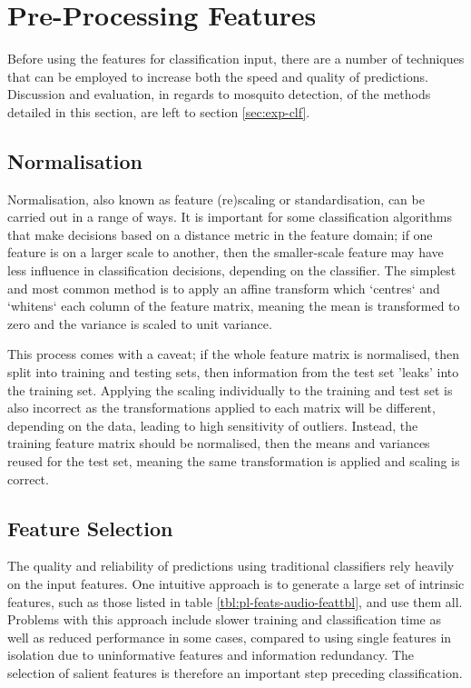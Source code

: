 \section{Pre-Processing Features}
\label{sec:pl-featpreproc}
    Before using the features for classification input, there are a number of techniques that can be employed to increase both the speed and quality of predictions. Discussion and evaluation, in regards to mosquito detection, of the methods detailed in this section, are left to section \ref{sec:exp-clf}.

    \subsection{Normalisation}
    \label{subsec:pl-featpreproc-norm}
        Normalisation, also known as feature (re)scaling or standardisation, can be carried out in a range of ways. It is important for some classification algorithms that make decisions based on a distance metric in the feature domain; if one feature is on a larger scale to another, then the smaller-scale feature may have less influence in classification decisions, depending on the classifier.     
        The simplest and most common method is to apply an affine transform which `centres` and `whitens` each column of the feature matrix, meaning the mean is transformed to zero and the variance is scaled to unit variance.
        
        This process comes with a caveat; if the whole feature matrix is normalised, then split into training and testing sets, then information from the test set 'leaks' into the training set. Applying the scaling individually to the training and test set is also incorrect as the transformations applied to each matrix will be different, depending on the data, leading to high sensitivity of outliers. Instead, the training feature matrix should be normalised, then the means and variances reused for the test set, meaning the same transformation is applied and scaling is correct.

    \subsection{Feature Selection}
    \label{subsec:pl-featpreproc-sel}
        The quality and reliability of predictions using traditional classifiers rely heavily on the input features. One intuitive approach is to generate a large set of intrinsic features, such as those listed in table \ref{tbl:pl-feats-audio-feattbl}, and use them all. Problems with this approach include slower training and classification time as well as reduced performance in some cases, compared to using single features in isolation due to uninformative features and information redundancy. The selection of salient features is therefore an important step preceding classification. 
        
